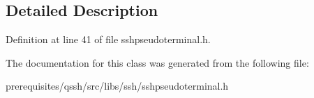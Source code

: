 \subsection{Detailed Description}


Definition at line 41 of file sshpseudoterminal.\+h.



The documentation for this class was generated from the following file\+:\begin{DoxyCompactItemize}
\item 
prerequisites/qssh/src/libs/ssh/sshpseudoterminal.\+h\end{DoxyCompactItemize}
